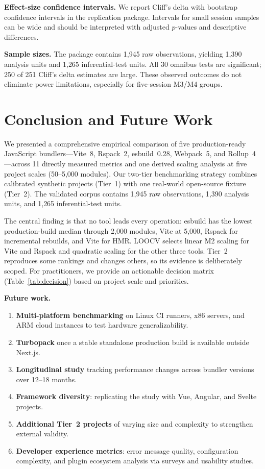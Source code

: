 \documentclass[preprint,12pt]{elsarticle}
\begin{document}
\textbf{Effect-size confidence intervals.}
We report Cliff's delta with bootstrap confidence intervals in the replication package.
Intervals for small session samples can be wide and should be interpreted with adjusted $p$-values and descriptive differences.

\textbf{Sample sizes.}
The package contains 1{,}945 raw observations, yielding 1{,}390 analysis units and 1{,}265 inferential-test units.
All 30 omnibus tests are significant; 250 of 251 Cliff's delta estimates are large.
These observed outcomes do not eliminate power limitations, especially for five-session M3/M4 groups.

\section{Conclusion and Future Work}\label{sec:conclusion}

We presented a comprehensive empirical comparison of five production-ready JavaScript bundlers---Vite~8, Rspack~2, esbuild~0.28, Webpack~5, and Rollup~4---across 11 directly measured metrics and one derived scaling analysis at five project scales (50--5{,}000 modules).
Our two-tier benchmarking strategy combines calibrated synthetic projects (Tier~1) with one real-world open-source fixture (Tier~2).
The validated corpus contains 1{,}945 raw observations, 1{,}390 analysis units, and 1{,}265 inferential-test units.

The central finding is that no tool leads every operation: esbuild has the lowest production-build median through 2{,}000 modules, Vite at 5{,}000, Rspack for incremental rebuilds, and Vite for HMR.
LOOCV selects linear M2 scaling for Vite and Rspack and quadratic scaling for the other three tools.
Tier~2 reproduces some rankings and changes others, so its evidence is deliberately scoped.
For practitioners, we provide an actionable decision matrix (Table~\ref{tab:decision}) based on project scale and priorities.

\medskip\noindent\textbf{Future work.}
\begin{enumerate}[leftmargin=*]
  \item \textbf{Multi-platform benchmarking} on Linux CI runners, x86 servers, and ARM cloud instances to test hardware generalizability.
  \item \textbf{Turbopack} once a stable standalone production build is available outside Next.js.
  \item \textbf{Longitudinal study} tracking performance changes across bundler versions over 12--18 months.
  \item \textbf{Framework diversity}: replicating the study with Vue, Angular, and Svelte projects.
  \item \textbf{Additional Tier~2 projects} of varying size and complexity to strengthen external validity.
  \item \textbf{Developer experience metrics}: error message quality, configuration complexity, and plugin ecosystem analysis via surveys and usability studies.
\end{enumerate}
\end{document}
